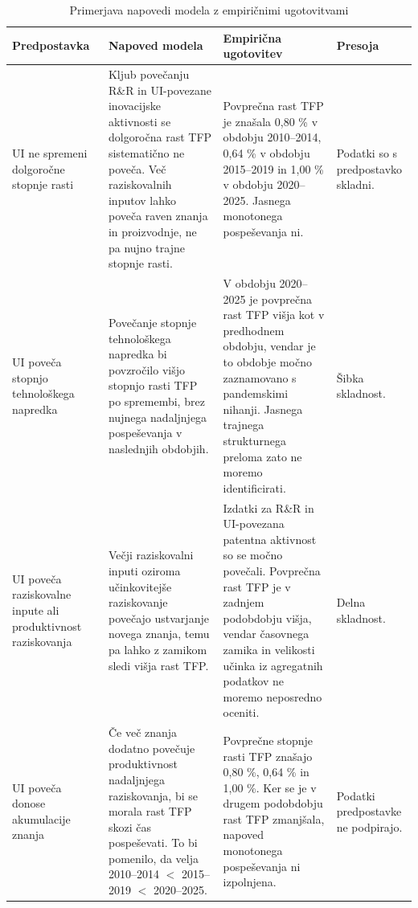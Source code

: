 \documentclass[12pt,a4paper]{article}
\begin{document}
\begin{table}[H]
\centering
\caption{Primerjava napovedi modela z empiričnimi ugotovitvami}
\small
\renewcommand{\arraystretch}{1.2}

\begin{tabularx}{\textwidth}{
>{\raggedright\arraybackslash}p{3.4cm}
>{\raggedright\arraybackslash}X
>{\raggedright\arraybackslash}X
>{\raggedright\arraybackslash}p{2.4cm}
}
\toprule
\textbf{Predpostavka} &
\textbf{Napoved modela} &
\textbf{Empirična ugotovitev} &
\textbf{Presoja} \\
\midrule

UI ne spremeni dolgoročne stopnje rasti &
Kljub povečanju R\&R in UI-povezane inovacijske aktivnosti se dolgoročna rast TFP sistematično ne poveča. Več raziskovalnih inputov lahko poveča raven znanja in proizvodnje, ne pa nujno trajne stopnje rasti. &
Povprečna rast TFP je znašala 0,80 \% v obdobju 2010--2014, 0,64 \% v obdobju 2015--2019 in 1,00 \% v obdobju 2020--2025. Jasnega monotonega pospeševanja ni. &
Podatki so s predpostavko skladni. \\

\midrule

UI poveča stopnjo tehnološkega napredka &
Povečanje stopnje tehnološkega napredka bi povzročilo višjo stopnjo rasti TFP po spremembi, brez nujnega nadaljnjega pospeševanja v naslednjih obdobjih. &
V obdobju 2020--2025 je povprečna rast TFP višja kot v predhodnem obdobju, vendar je to obdobje močno zaznamovano s pandemskimi nihanji. Jasnega trajnega strukturnega preloma zato ne moremo identificirati. &
Šibka skladnost. \\

\midrule

UI poveča raziskovalne inpute ali produktivnost raziskovanja &
Večji raziskovalni inputi oziroma učinkovitejše raziskovanje povečajo ustvarjanje novega znanja, temu pa lahko z zamikom sledi višja rast TFP. &
Izdatki za R\&R in UI-povezana patentna aktivnost so se močno povečali. Povprečna rast TFP je v zadnjem podobdobju višja, vendar časovnega zamika in velikosti učinka iz agregatnih podatkov ne moremo neposredno oceniti. &
Delna skladnost. \\

\midrule

UI poveča donose akumulacije znanja &
Če več znanja dodatno povečuje produktivnost nadaljnjega raziskovanja, bi se morala rast TFP skozi čas pospeševati. To bi pomenilo, da velja 2010--2014 $<$ 2015--2019 $<$ 2020--2025. &
Povprečne stopnje rasti TFP znašajo 0,80 \%, 0,64 \% in 1,00 \%. Ker se je v drugem podobdobju rast TFP zmanjšala, napoved monotonega pospeševanja ni izpolnjena. &
Podatki predpostavke ne podpirajo. \\

\bottomrule
\end{tabularx}

\label{tab:hipoteze_podatki}
\end{table}
\end{document}
